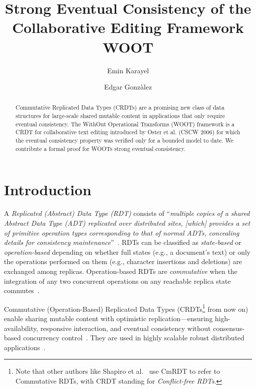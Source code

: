 \documentclass[11pt,a4paper]{article}
\begin{document}
\title{Strong Eventual Consistency of the Collaborative Editing Framework WOOT}
\author{Emin Karayel}
\author{Edgar Gonzàlez}
\maketitle

\setlength\parindent{1em}
\setlength\parskip{0.5ex}

\begin{abstract}
  Commutative Replicated Data Types (CRDTs) are a promising new class of data structures for large-scale shared mutable content in applications that only require eventual consistency.
The WithOut Operational Transforms (WOOT) framework is a CRDT for collaborative text editing introduced by Oster et al. (CSCW 2006) for which the eventual consistency property was verified only for a bounded model to date.
We contribute a formal proof for WOOTs strong eventual consistency.
\end{abstract}

\tableofcontents

\section{Introduction}%
A \emph{Replicated (Abstract) Data Type (RDT)} consists of ``\emph{multiple copies of a shared Abstract Data Type (ADT) replicated over distributed sites, [which] provides a set of primitive operation types corresponding to that of normal ADTs, concealing details for consistency maintenance}''~\cite{roh2009optimistic}.
RDTs can be classified as \emph{state-based} or \emph{operation-based} depending on whether full states (e.g., a document's text) or only the operations performed on them (e.g., character insertions and deletions) are exchanged among replicas.
Operation-based RDTs are \emph{commutative} when the integration of any two concurrent operations on any reachable replica state commutes~\cite{shapiro2011conflict}.

Commutative (Operation-Based) Replicated Data Types (CRDTs\footnote{Note that other authors like Shapiro et al.~\cite{shapiro2011conflict} use CmRDT to refer to Commutative RDTs, with CRDT standing for \emph{Conflict-free RDTs}.} from now on) enable sharing mutable content with optimistic replication---ensu\-ring high\hyp{}availability, responsive interaction, and eventual consistency without consensus\hyp{}ba\-sed concurrency control~\cite{letia2010consistency}.
They are used in highly scalable robust distributed applications~\cite{weiss2009logoot,brown2014riak}.
\end{document}
